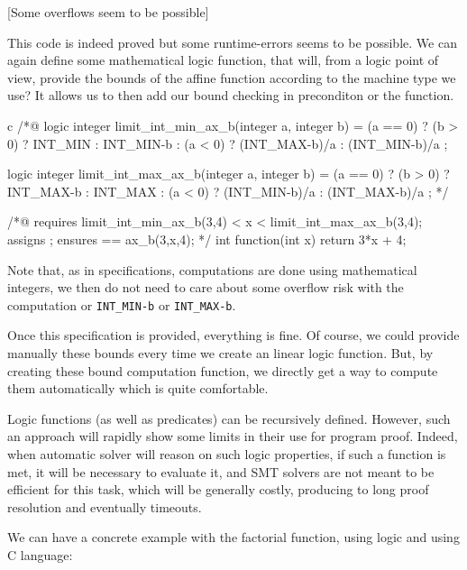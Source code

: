 \documentclass[middle]{zmdocument}
\begin{document}
[Some overflows seem to be possible]


This code is indeed proved but some runtime-errors seems to be possible.
We can again define some mathematical logic function, that will, from a
logic point of view, provide the bounds of the affine function according
to the machine type we use? It allows us to then add our bound checking
in preconditon or the function.


\begin{CodeBlock}{c}
/*@
  logic integer limit_int_min_ax_b(integer a, integer b) =
    (a == 0) ? (b > 0) ? INT_MIN : INT_MIN-b :
    (a <  0) ? (INT_MAX-b)/a :
               (INT_MIN-b)/a ;

  logic integer limit_int_max_ax_b(integer a, integer b) =
    (a == 0) ? (b > 0) ? INT_MAX-b : INT_MAX :
    (a <  0) ? (INT_MIN-b)/a :
               (INT_MAX-b)/a ;
*/

/*@
  requires limit_int_min_ax_b(3,4) < x < limit_int_max_ax_b(3,4);
  assigns \nothing ;
  ensures \result == ax_b(3,x,4);
*/
int function(int x){
  return 3*x + 4;
}
\end{CodeBlock}



\begin{Information}
  Note that, as in specifications, computations are done using mathematical
  integers, we then do not need to care about some overflow risk with the
  computation or \texttt{INT\_MIN-b} or \texttt{INT\_MAX-b}.
\end{Information}


Once this specification is provided, everything is fine. Of course, we
could provide manually these bounds every time we create an linear logic
function. But, by creating these bound computation function, we directly
get a way to compute them automatically which is quite comfortable.





Logic functions (as well as predicates) can be recursively defined.
However, such an approach will rapidly show some limits in their use for
program proof. Indeed, when automatic solver will reason on such logic
properties, if such a function is met, it will be necessary to evaluate
it, and SMT solvers are not meant to be efficient for this task, which
will be generally costly, producing to long proof resolution and
eventually timeouts.

We can have a concrete example with the factorial function, using logic
and using C language:
\end{document}
